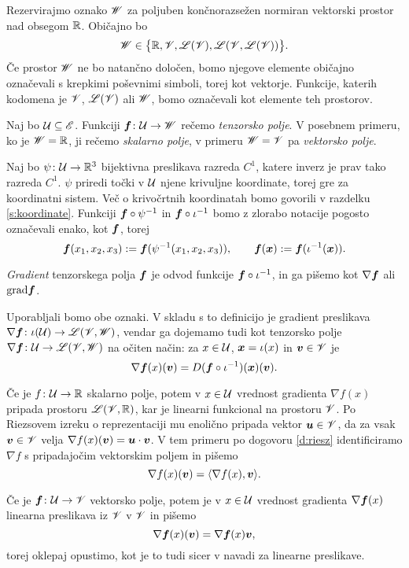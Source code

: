 Rezervirajmo oznako $\mathscr W$ za poljuben končnorazsežen normiran vektorski
prostor nad obsegom $\mathbb R$. Običajno bo
\[ \mathscr W\in\big\{ \mathbb R,\mathscr V,\mathscr L(\mathscr V),\mathscr L(\mathscr V,\mathscr L(\mathscr V)) \big\}. \]
Če prostor $\mathscr W$ ne bo natančno določen, bomo njegove elemente običajno označevali s krepkimi poševnimi simboli, torej kot vektorje.
Funkcije, katerih kodomena je $\mathscr V$, $\mathscr L(\mathscr V)$ ali $\mathscr W$, bomo označevali kot elemente teh prostorov.

Naj bo $\mathcal U\subseteq\mathscr E$. Funkciji $\boldsymbol f\colon \mathcal U\to\mathscr W$ rečemo \emph{tenzorsko polje}.
V posebnem primeru, ko je $\mathscr W=\mathbb R$, ji rečemo \emph{skalarno polje},
v primeru $\mathscr W=\mathscr V$ pa \emph{vektorsko polje}.

Naj bo $\psi\colon \mathcal U\to\mathbb R^3$ bijektivna preslikava razreda $C^1$, katere inverz je prav tako
razreda $C^1$. $\psi$ priredi točki v $\mathcal U$ njene krivuljne koordinate, torej gre za koordinatni sistem.
Več o krivočrtnih koordinatah bomo govorili v razdelku \ref{s:koordinate}.
Funkciji $\boldsymbol f\circ\psi^{-1}$ in $\boldsymbol f\circ\iota^{-1}$ bomo z zlorabo notacije pogosto
označevali enako, kot $\boldsymbol f$, torej
\[
	\boldsymbol f(x_1,x_2,x_3):=\boldsymbol f(\psi^{-1}(x_1,x_2,x_3)),\qquad
	\boldsymbol f(\boldsymbol x):=\boldsymbol f(\iota^{-1}(\boldsymbol x)).
\]

\begin{definicija}
	\emph{Gradient} tenzorskega polja $\boldsymbol f$ je odvod funkcije $\boldsymbol f\circ\iota^{-1}$,
	in ga pišemo kot $\nabla\boldsymbol f$ ali $\mathrm{grad}\boldsymbol f$.
\end{definicija}
Uporabljali bomo obe oznaki. V skladu s to definicijo je gradient preslikava
$\nabla\boldsymbol f\colon\iota(\mathcal U)\to\mathscr L(\mathscr V,\mathscr W)$, vendar ga dojemamo tudi kot tenzorsko polje
$\nabla\boldsymbol f\colon\mathcal U\to\mathscr L(\mathscr V,\mathscr W)$ na očiten način: za $x\in \mathcal U$,
$\boldsymbol x=\iota(x)$ in $\boldsymbol v\in\mathscr V$ je
\[
	\nabla\boldsymbol f(x)(\boldsymbol v)=D(\boldsymbol f\circ\iota^{-1})(\boldsymbol x)(\boldsymbol v).
\]

Če je $f\colon \mathcal U\to\mathbb R$ skalarno polje, potem v $x\in \mathcal U$ vrednost gradienta $\nabla f(x)$
pripada prostoru $\mathscr L(\mathscr V,\mathbb R)$, kar je linearni funkcional na prostoru $\mathscr V$. Po Riezsovem
izreku o reprezentaciji mu enolično pripada vektor $\boldsymbol u\in\mathscr V$, da za vsak
$\boldsymbol v\in\mathscr V$ velja $\nabla f(x)(\boldsymbol v)=\boldsymbol u\cdot\boldsymbol v$. V tem primeru po
dogovoru \ref{d:riesz} identificiramo $\nabla f$ s pripadajočim vektorskim poljem in pišemo
\[ \nabla f(x)(\boldsymbol v)=\langle\nabla f(x),\boldsymbol v\rangle. \]

Če je $\boldsymbol f\colon \mathcal U\to\mathscr V$ vektorsko polje, potem je v $x\in \mathcal U$ vrednost gradienta $\nabla\boldsymbol f(x)$
linearna preslikava iz $\mathscr V$ v $\mathscr V$ in pišemo
\[ \nabla\boldsymbol f(x)(\boldsymbol v)=\nabla\boldsymbol f(x)\boldsymbol v, \]
torej oklepaj opustimo, kot je to tudi sicer v navadi za linearne preslikave.


